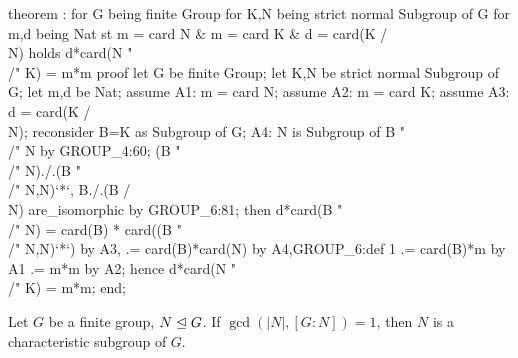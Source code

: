 \nwenddocs{}\endmoddef\nwstartdeflinemarkup{}\nwenddeflinemarkup
theorem :
  for G being finite Group
  for K,N being strict normal Subgroup of G
  for m,d being Nat
  st m = card N & m = card K & d = card(K /\\ N)
  holds d*card(N "\\/" K) = m*m
proof
  let G be finite Group;
  let K,N be strict normal Subgroup of G;
  let m,d be Nat;
  assume A1: m = card N;
  assume A2: m = card K;
  assume A3: d = card(K /\\ N);
  reconsider B=K as Subgroup of G;
  A4: N is Subgroup of B "\\/" N by GROUP_4:60;
  (B "\\/" N)./.(B "\\/" N,N)`*`, B./.(B /\\ N) are_isomorphic by GROUP_6:81;
  then d*card(B "\\/" N) = card(B) * card((B "\\/" N,N)`*`) by A3,
                       .= card(B)*card(N) by A4,GROUP_6:def 1
                       .= card(B)*m by A1
                       .= m*m by A2;
  hence d*card(N "\\/" K) = m*m;
end;
\eatline
{}\nwendcode{}\nwdocspar
\begin{theorem}
Let $G$ be a finite group, $N\trianglelefteq G$.
If $\gcd(|N|, [G:N])=1$, then $N$ is a characteristic subgroup of $G$.
\end{theorem}

